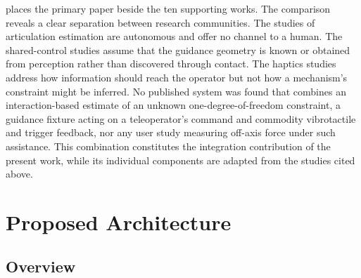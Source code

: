 \documentclass[11pt,letterpaper]{article}
\begin{document}
 places the primary paper beside the ten supporting works. The comparison reveals a clear separation between research communities. The studies of articulation estimation \cite{lutscher2010control,buchanan2024online,zhao2025tacman,doshi2022manipulation,gupta2025opening} are autonomous and offer no channel to a human. The shared-control studies \cite{pruks2022method,selvaggio2021autonomy,li2023classification} assume that the guidance geometry is known or obtained from perception rather than discovered through contact. The haptics studies \cite{pacchierotti2024cutaneous,avilacampos2024conveying,boulay2026selecting} address how information should reach the operator but not how a mechanism's constraint might be inferred. No published system was found that combines an interaction-based estimate of an unknown one-degree-of-freedom constraint, a guidance fixture acting on a teleoperator's command and commodity vibrotactile and trigger feedback, nor any user study measuring off-axis force under such assistance. This combination constitutes the integration contribution of the present work, while its individual components are adapted from the studies cited above.



\section{Proposed Architecture}
\label{sec:architecture}

\subsection{Overview}
\label{sec:overview}
\end{document}
